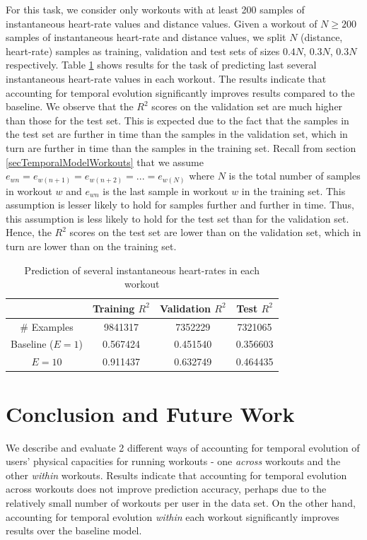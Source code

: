 \documentclass{acm_proc_article-sp}
\begin{document}
For this task, we consider only workouts with at least 200 samples of instantaneous heart-rate values and distance values. Given a workout of $N \geq 200$ samples of instantaneous heart-rate and distance values, we split $N$ (distance, heart-rate) samples as training, validation and test sets of sizes $0.4N$, $0.3N$, $0.3N$ respectively. Table \ref{tableInstManyHr} shows results for the task of predicting last several instantaneous heart-rate values in each workout. The results indicate that accounting for temporal evolution significantly improves results compared to the baseline. We observe that the $R^2$ scores on the validation set are much higher than those for the test set. This is expected due to the fact that the samples in the test set are further in time than the samples in the validation set, which in turn are further in time than the samples in the training set. Recall from section \ref{secTemporalModelWorkouts} that we assume $e_{wn} = e_{w(n+1)} = e_{w(n+2)} = ... = e_{w(N)}$ where $N$ is the total number of samples in workout $w$ and $e_{wn}$ is the last sample in workout $w$ in the training set. This assumption is lesser likely to hold for samples further and further in time. Thus, this assumption is less likely to hold for the test set than for the validation set. Hence, the $R^2$ scores on the test set
are lower than on the validation set, which in turn are lower than on the training set.
\begin{table}[H]
\centering
\begin{tabular}{|c|c|c|c|} \hline
& Training $R^2$ & Validation $R^2$ & Test $R^2$ \\ \hline
\# Examples &  9841317 & 7352229 & 7321065 \\ \hline
Baseline ($E = 1$) & 0.567424 & 0.451540 & 0.356603 \\ \hline
$E = 10$ & 0.911437 & 0.632749 & 0.464435 \\ \hline
\end{tabular}
\caption{Prediction of several instantaneous heart-rates in each workout}
\label{tableInstManyHr}
\end{table}

\section{Conclusion and Future Work}
We describe and evaluate 2 different ways of accounting for temporal evolution of users' physical capacities for running workouts - one \emph{across} workouts and the other \emph{within} workouts. Results indicate that accounting for temporal evolution across workouts does not improve prediction accuracy, perhaps due to the relatively small number of workouts per user in the data set. On the other hand, accounting for temporal evolution \emph{within} each workout significantly improves results over the baseline model.
\end{document}
